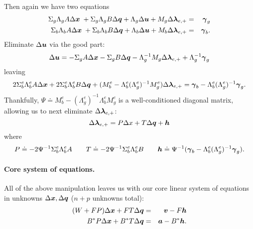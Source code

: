 Then again we have two equations 
\begin{eqnarray}
\Sigma_g \Lambda_g A \Delta {\boldsymbol{x}} \; + \Sigma_g \Lambda_g B \Delta {\boldsymbol q} + \Lambda_g \Delta \boldsymbol{u} + M_g \Delta \boldsymbol{\lambda}_{e,+} &=& \boldsymbol{\gamma}_g \\
\Sigma_b \Lambda_b A \Delta {\boldsymbol{x}} \; +  \Sigma_b \Lambda_b B \Delta {\boldsymbol q} + \Lambda_b \Delta \boldsymbol{u} + M_b \Delta \boldsymbol{\lambda}_{e,+} &=& \boldsymbol{\gamma}_b. \label{eqn:bot-bad}
\end{eqnarray}
Eliminate $\Delta \boldsymbol{u}$ via the good part:
\begin{equation}
\Delta \boldsymbol{u} = - \Sigma_g A \Delta {\boldsymbol{x}} - \Sigma_g B \Delta {\boldsymbol q} - \Lambda_g^{-1} M_g \Delta \boldsymbol{\lambda}_{e,+} + \Lambda_g^{-1} \boldsymbol{\gamma}_g
\end{equation}
leaving 
\begin{equation}
2 \Sigma^e_b \Lambda^e_b A \Delta {\boldsymbol{x}} + 2 \Sigma^e_b \Lambda^e_b B \Delta {\boldsymbol q} + (M^e_b - \Lambda^e_b (\Lambda^e_g)^{-1} M^e_g) \Delta \boldsymbol{\lambda}_{e,+} = \boldsymbol{\gamma}_b - \Lambda^e_b (\Lambda^e_g)^{-1} \boldsymbol{\gamma}_g.
\end{equation}
Thankfully, $\Psi \doteq M_b^e - (\Lambda^e_g)^{-1} \Lambda^e_b M^e_g$ is a well-conditioned diagonal matrix, allowing us to next eliminate $\Delta \boldsymbol{\lambda}_{e,+}$:
\begin{equation}
\Delta \boldsymbol{\lambda}_{e,+} = P\Delta x + T \Delta {\boldsymbol q} + \boldsymbol{h}
\end{equation}
where 
\begin{equation}
P \doteq - 2 \Psi^{-1} \Sigma^e_b \Lambda^e_b A \qquad T \doteq -2 \Psi^{-1}\Sigma^e_b \Lambda^e_b B \qquad \boldsymbol{h} \doteq \Psi^{-1}( \boldsymbol{\gamma}_b - \Lambda^e_b (\Lambda^e_g)^{-1} \boldsymbol{\gamma}_g ).
\end{equation}

\paragraph{Core system of equations.} All of the above manipulation leaves us with our core linear system of equations in unknowns $\Delta {\boldsymbol{x}}, \Delta {\boldsymbol q}$ ($n + p$ unknowns total):
\begin{eqnarray}
(W+FP) \Delta {\boldsymbol{x}} + F T \Delta {\boldsymbol q} &=& \boldsymbol{v} - F \boldsymbol{h} \\
B^* P \Delta {\boldsymbol{x}} + B^* T \Delta {\boldsymbol q} &=& \boldsymbol{a} - B^* \boldsymbol{h} .
\end{eqnarray}

